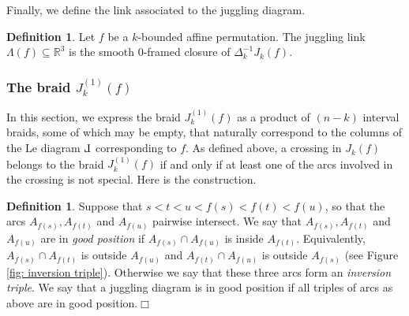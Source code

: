 \documentclass[10pt]{amsart}
\theoremstyle{plain}
\theoremstyle{definition}
\newtheorem{definition}[thm]{Definition}
\theoremstyle{remark}
\numberwithin{equation}{section}
\newcommand{\R}{\mathbb{R}}
\newcommand{\La}{\Lambda}
\newcommand{\sse}{\subseteq}
\newcommand{\Ja}{J^{(1)}}
\def\Le{\reflectbox{$\mathrm{L}$}}
\begin{document}

Finally, we define the link associated to the juggling diagram.

\begin{definition}
Let $f$ be a $k$-bounded affine permutation. The juggling link $\La(f) \sse \R^3$ is the smooth $0$-framed closure of $\Delta_{k}^{-1}J_k(f)$.
\end{definition}





\subsubsection{The braid $J_{k}^{(1)}(f)$} In this section, we express the braid $\Ja_{k}(f)$ as a product of $(n-k)$ interval braids, some of which may be empty, that naturally correspond to the columns of the Le diagram $\Le$ corresponding to $f$. %
As defined above, a crossing in $J_{k}(f)$ belongs to the braid $\Ja_{k}(f)$ if and only if at least one of the arcs involved in the crossing is not special. Here is the construction.

\begin{definition}
Suppose that $s<t<u<f(s)<f(t)<f(u)$, so that the arcs $A_{f(s)},A_{f(t)}$ and $A_{f(u)}$ pairwise intersect. We say that $A_{f(s)},A_{f(t)}$ and $A_{f(u)}$ are in {\em good position} if $A_{f(s)}\cap A_{f(u)}$ is inside $A_{f(t)}$. Equivalently, $A_{f(s)}\cap A_{f(t)}$ is outside $A_{f(u)}$ and $A_{f(t)}\cap A_{f(u)}$ is outside $A_{f(s)}$ (see Figure \ref{fig: inversion triple}). Otherwise we say that these three arcs form an \emph{inversion triple}. We say that a juggling diagram is in good position if all triples of arcs as above are in good position.\hfill$\Box$
\end{definition}
\end{document}
